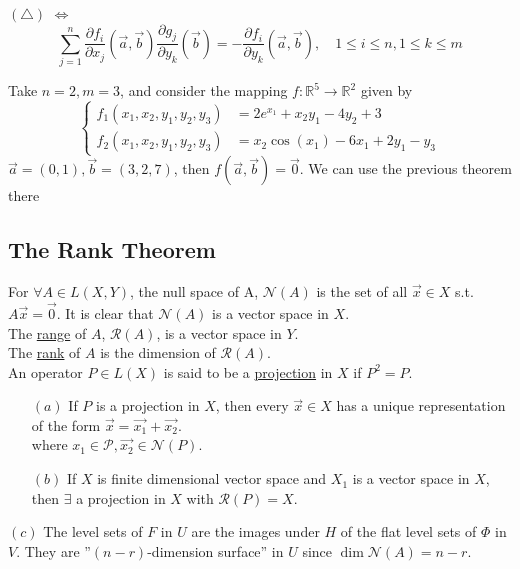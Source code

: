 \begin{remark}
     $ (\triangle )$  $ \Leftrightarrow  $ 
     \[\sum\limits_{j=1 }^{n } \dfrac{\partial f_i }{\partial x_j }(\vec{a},\vec{b})\dfrac{\partial g_j }{\partial y_k }(\vec{b})=-\dfrac{\partial f_i}{\partial y_k}(\vec{a},\vec{b}),\quad 1 \leqslant i \leqslant n,1 \leqslant k \leqslant m\] 
\end{remark}
\begin{example}
    Take  $ n=2,m=3 $, and consider the mapping  $ f:\mathbb{R}^5\rightarrow\mathbb{R}^2 $ given by 
    \[\left\{
        \begin{aligned}
            f_1(x_1,x_2,y_1,y_2,y_3)&=2e^{x_1}+x_2y_1-4y_2+3\\
            f_2(x_1,x_2,y_1,y_2,y_3)&=x_2\cos (x_1)-6x_1+2y_1-y_3
        \end{aligned}
    \right.\] 
     $ \vec{a}=(0,1),\vec{b}=(3,2,7) $, then  $ f(\vec{a},\vec{b})=\vec{0} $. We can use the previous theorem there   
\end{example}
\subsection{The Rank Theorem}
For  $ \forall A\in L(X,Y) $, the null space of A,  $ \mathscr{N}(A)$ is the set of all  $ \vec{x}
\in X $ s.t.  $ A\vec{x}=\vec{0} $. It is clear that  $ \mathscr{N}(A) $ is a vector space in  $ X $.\\
The \underline{range} of  $ A  $,  $ \mathscr{R}(A) $, is a vector space in  $ Y  $.\\
The \underline{rank} of  $ A  $ is the dimension of  $ \mathscr{R}(A)$.\\
An operator  $ P\in L(X) $ is said to be a \underline{projection} in  $ X  $ if  $ P^2=P $.
\begin{proposition}
    \begin{enumerate}
        \item[$ (a) $] If  $ P  $ is a projection in  $ X  $, then every  $ \vec{x}\in X  $ has a unique representation of the form  $ \vec{x}=\vec{x_1}+\vec{x_2} $.\\
        where  $ x_1\in \mathscr{P},\vec{x_2}\in \mathscr{N}(P) $.
        \item[$ (b) $] If  $ X  $ is finite dimensional vector space and  $ X_1  $ is a vector space in  $ X  $, then  $ \exists  $ a projection in  $ X  $ with  $ \mathscr{R }(P )=X $.  
    \end{enumerate}
    \item[$ (c) $] The level sets of  $ F  $ in  $ U  $ are the images under  $ H  $ of the flat level sets of  $ \Phi  $ in  $ V  $. They are  ''$ (n-r) $-dimension surface'' in  $ U  $ since  $ \dim \mathscr{N }
    (A)=n-r $.  
\end{proposition}        